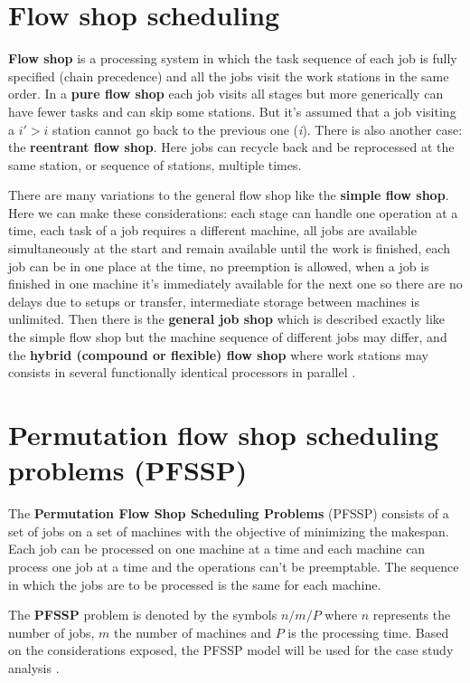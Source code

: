 \section[Flow shop scheduling]{Flow shop scheduling}

\textbf{Flow shop} is a processing system in which the task sequence of each job is fully specified (chain precedence) and all the jobs visit the work stations in the same order. In a \textbf{pure flow shop} each job visits all stages but more generically can have fewer tasks and can skip some stations. But it's assumed that a job visiting a $i' > i$ station cannot go back to the previous one (\textit{i}). There is also another case: the \textbf{reentrant flow shop}. Here jobs can recycle back and be reprocessed at the same station, or sequence of stations, multiple times.

There are many variations to the general flow shop like the \textbf{simple flow shop}. Here we can make these considerations: each stage can handle one operation at a time, each task of a job requires a different machine, all jobs are available simultaneously at the start and remain available until the work is finished, each job can be in one place at the time, no preemption is allowed, when a job is finished in one machine it's immediately available for the next one so there are no delays due to setups or transfer, intermediate storage between machines is unlimited. Then there is the \textbf{general job shop} which is described exactly like the simple flow shop but the machine sequence of different jobs may differ, and the \textbf{hybrid (compound or flexible) flow shop} where work stations may consists in several functionally identical processors in parallel \cite{emmons2012flow}.

\section[Permutation flow shop scheduling problems (PFSSP)]{Permutation flow shop scheduling problems (PFSSP)}

The \textbf{Permutation Flow Shop Scheduling Problems} (PFSSP) consists of a set of jobs on a set of machines with the objective of minimizing the makespan. Each job can be processed on one machine at a time and each machine can process one job at a time and the operations can't be preemptable. The sequence in which the jobs are to be processed is the same for each machine.

The  \textbf{PFSSP} problem is denoted by the symbols $n/m/P$ where $n$ represents the number of jobs, $m$ the number of machines and $P$ is the processing time. Based on the considerations exposed, the PFSSP model will be used for the case study analysis \cite{LI20121921}.